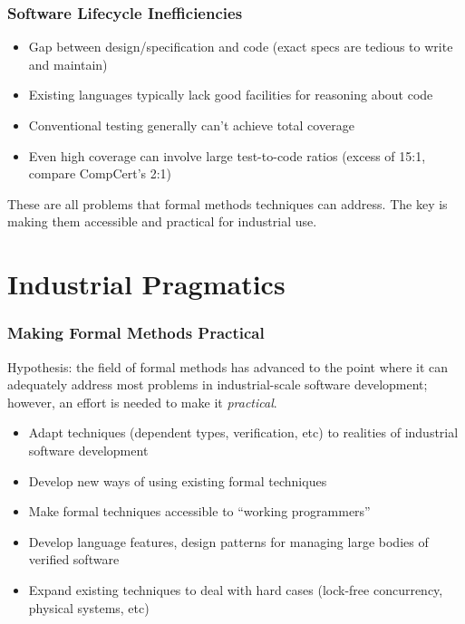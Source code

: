 \documentclass{beamer}
\begin{document}
\begin{frame}
  \frametitle{Software Lifecycle Inefficiencies}
  \begin{itemize}
    \item Gap between design/specification and code (exact specs are
      tedious to write and maintain)
    \item Existing languages typically lack good facilities for
      reasoning about code
    \item Conventional testing generally can't achieve total coverage
    \item Even high coverage can involve large test-to-code ratios
      (excess of 15:1, compare CompCert's 2:1)
  \end{itemize}
\end{frame}

\begin{frame}
  These are all problems that formal methods techniques can address.
  The key is making them accessible and practical for industrial use.
\end{frame}

\section{Industrial Pragmatics}

\begin{frame}
  \frametitle{Making Formal Methods Practical}
  Hypothesis: the field of formal methods has advanced to the point
  where it can adequately address most problems in industrial-scale
  software development; however, an effort is needed to make it
  \emph{practical}.
  \begin{itemize}
    \item Adapt techniques (dependent types, verification, etc) to
      realities of industrial software development
    \item Develop new ways of using existing formal techniques
    \item Make formal techniques accessible to ``working programmers''
    \item Develop language features, design patterns for managing
      large bodies of verified software
    \item Expand existing techniques to deal with hard cases
      (lock-free concurrency, physical systems, etc)
  \end{itemize}
\end{frame}
\end{document}
